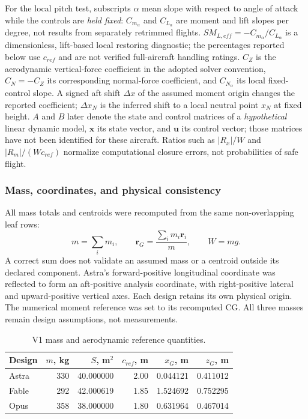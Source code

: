 \documentclass[11pt,a4paper]{article}
\begin{document}
For the local pitch test, subscripts $\alpha$ mean slope with respect to angle of attack while the controls are \emph{held fixed}: $C_{m_\alpha}$ and $C_{L_\alpha}$ are moment and lift slopes per degree, not results from separately retrimmed flights. $SM_{L,eff}=-C_{m_\alpha}/C_{L_\alpha}$ is a dimensionless, lift-based local restoring diagnostic; the percentages reported below use $c_{ref}$ and are not verified full-aircraft handling ratings. $C_Z$ is the aerodynamic vertical-force coefficient in the adopted solver convention, $C_N=-C_Z$ its corresponding normal-force coefficient, and $C_{N_\alpha}$ its local fixed-control slope. A signed aft shift $\Delta x$ of the assumed moment origin changes the reported coefficient; $\Delta x_N$ is the inferred shift to a local neutral point $x_N$ at fixed height. $A$ and $B$ later denote the state and control matrices of a \emph{hypothetical} linear dynamic model, $\boldsymbol x$ its state vector, and $\boldsymbol u$ its control vector; those matrices have not been identified for these aircraft. Ratios such as $|R_x|/W$ and $|R_m|/(Wc_{ref})$ normalize computational closure errors, not probabilities of safe flight.

\subsubsection{Mass, coordinates, and physical consistency}
All mass totals and centroids were recomputed from the same non-overlapping leaf rows:
\begin{equation}
m=\sum_i m_i,\qquad \boldsymbol r_G=\frac{\sum_i m_i\boldsymbol r_i}{m},\qquad W=mg.
\label{eq:mass}
\end{equation}
A correct sum does not validate an assumed mass or a centroid outside its declared component. Astra's forward-positive longitudinal coordinate was reflected to form an aft-positive analysis coordinate, with right-positive lateral and upward-positive vertical axes. Each design retains its own physical origin. The numerical moment reference was set to its recomputed CG. All three masses remain design assumptions, not measurements.

\begin{table}[H]\centering\small
\caption{V1 mass and aerodynamic reference quantities.}\label{tab:refs}
\begin{tabular}{lrrrrr}\toprule
Design & $m$, kg & $S$, m$^2$ & $c_{ref}$, m & $x_G$, m & $z_G$, m\\\midrule
Astra &330&40.000000&2.00&0.044121&0.411012\\
Fable &292&42.000619&1.85&1.524692&0.752295\\
Opus &358&38.000000&1.80&0.631964&0.467014\\\bottomrule
\end{tabular}
\end{table}
\end{document}
